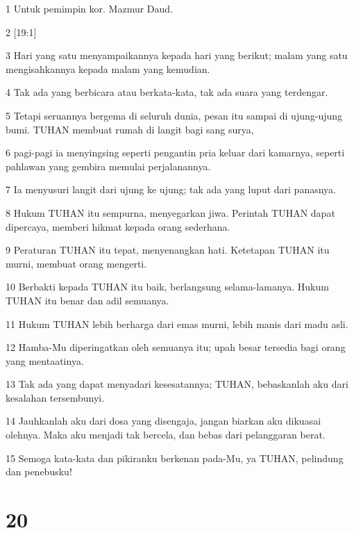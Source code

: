 \par 1 Untuk pemimpin kor. Mazmur Daud.
\par 2 [19:1]
\par 3 Hari yang satu menyampaikannya kepada hari yang berikut; malam yang satu mengisahkannya kepada malam yang kemudian.
\par 4 Tak ada yang berbicara atau berkata-kata, tak ada suara yang terdengar.
\par 5 Tetapi seruannya bergema di seluruh dunia, pesan itu sampai di ujung-ujung bumi. TUHAN membuat rumah di langit bagi sang surya,
\par 6 pagi-pagi ia menyingsing seperti pengantin pria keluar dari kamarnya, seperti pahlawan yang gembira memulai perjalanannya.
\par 7 Ia menyusuri langit dari ujung ke ujung; tak ada yang luput dari panasnya.
\par 8 Hukum TUHAN itu sempurna, menyegarkan jiwa. Perintah TUHAN dapat dipercaya, memberi hikmat kepada orang sederhana.
\par 9 Peraturan TUHAN itu tepat, menyenangkan hati. Ketetapan TUHAN itu murni, membuat orang mengerti.
\par 10 Berbakti kepada TUHAN itu baik, berlangsung selama-lamanya. Hukum TUHAN itu benar dan adil semuanya.
\par 11 Hukum TUHAN lebih berharga dari emas murni, lebih manis dari madu asli.
\par 12 Hamba-Mu diperingatkan oleh semuanya itu; upah besar tersedia bagi orang yang mentaatinya.
\par 13 Tak ada yang dapat menyadari kesesatannya; TUHAN, bebaskanlah aku dari kesalahan tersembunyi.
\par 14 Jauhkanlah aku dari dosa yang disengaja, jangan biarkan aku dikuasai olehnya. Maka aku menjadi tak bercela, dan bebas dari pelanggaran berat.
\par 15 Semoga kata-kata dan pikiranku berkenan pada-Mu, ya TUHAN, pelindung dan penebusku!

\chapter{20}

